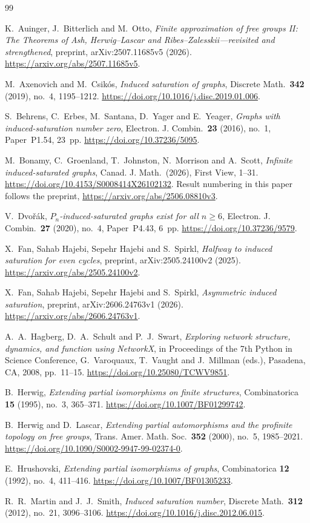 \documentclass[11pt,reqno]{amsart}
\theoremstyle{definition}
\theoremstyle{remark}
\begin{document}
\begin{thebibliography}{99}
\raggedright

K.~Auinger, J.~Bitterlich and M.~Otto,
\emph{Finite approximation of free groups II: The Theorems of Ash, Herwig--Lascar and Ribes--Zalesskii---revisited and strengthened},
preprint, arXiv:2507.11685v5 (2026).
\url{https://arxiv.org/abs/2507.11685v5}.

M.~Axenovich and M.~Csik\'os,
\emph{Induced saturation of graphs},
Discrete Math.\ \textbf{342} (2019), no.~4, 1195--1212.
\url{https://doi.org/10.1016/j.disc.2019.01.006}.

S.~Behrens, C.~Erbes, M.~Santana, D.~Yager and E.~Yeager,
\emph{Graphs with induced-saturation number zero},
Electron. J. Combin.\ \textbf{23} (2016), no.~1, Paper~P1.54, 23~pp.
\url{https://doi.org/10.37236/5095}.

M.~Bonamy, C.~Groenland, T.~Johnston, N.~Morrison and A.~Scott,
\emph{Infinite induced-saturated graphs},
Canad. J. Math.\ (2026), First View, 1--31.
\url{https://doi.org/10.4153/S0008414X26102132}.
Result numbering in this paper follows the preprint,
\url{https://arxiv.org/abs/2506.08810v3}.

V.~Dvo\v{r}\'ak,
\emph{$P_n$-induced-saturated graphs exist for all $n\ge6$},
Electron. J. Combin.\ \textbf{27} (2020), no.~4, Paper~P4.43, 6~pp.
\url{https://doi.org/10.37236/9579}.

X.~Fan, Sahab Hajebi, Sepehr Hajebi and S.~Spirkl,
\emph{Halfway to induced saturation for even cycles},
preprint, arXiv:2505.24100v2 (2025).
\url{https://arxiv.org/abs/2505.24100v2}.

X.~Fan, Sahab Hajebi, Sepehr Hajebi and S.~Spirkl,
\emph{Asymmetric induced saturation},
preprint, arXiv:2606.24763v1 (2026).
\url{https://arxiv.org/abs/2606.24763v1}.

A.~A.~Hagberg, D.~A.~Schult and P.~J.~Swart,
\emph{Exploring network structure, dynamics, and function using NetworkX},
in Proceedings of the 7th Python in Science Conference,
G.~Varoquaux, T.~Vaught and J.~Millman (eds.),
Pasadena, CA, 2008, pp.~11--15.
\url{https://doi.org/10.25080/TCWV9851}.

B.~Herwig,
\emph{Extending partial isomorphisms on finite structures},
Combinatorica \textbf{15} (1995), no.~3, 365--371.
\url{https://doi.org/10.1007/BF01299742}.

B.~Herwig and D.~Lascar,
\emph{Extending partial automorphisms and the profinite topology on free groups},
Trans. Amer. Math. Soc.\ \textbf{352} (2000), no.~5, 1985--2021.
\url{https://doi.org/10.1090/S0002-9947-99-02374-0}.

E.~Hrushovski,
\emph{Extending partial isomorphisms of graphs},
Combinatorica \textbf{12} (1992), no.~4, 411--416.
\url{https://doi.org/10.1007/BF01305233}.

R.~R.~Martin and J.~J.~Smith,
\emph{Induced saturation number},
Discrete Math.\ \textbf{312} (2012), no.~21, 3096--3106.
\url{https://doi.org/10.1016/j.disc.2012.06.015}.

\end{thebibliography}
\end{document}

